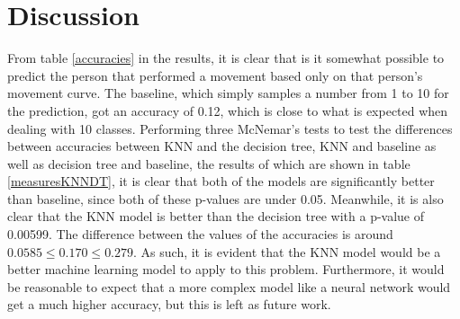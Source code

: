 \documentclass[11pt, fleqn, titlepage]{article}
\begin{document}
\section{Discussion}
From table \ref{accuracies} in the results, it is clear that is it somewhat possible to predict the person that performed a movement based only on that person's movement curve. The baseline, which simply samples a number from 1 to 10 for the prediction, got an accuracy of 0.12, which is close to what is expected when dealing with 10 classes. Performing three McNemar's tests to test the differences between accuracies between KNN and the decision tree, KNN and baseline as well as decision tree and baseline, the results of which are shown in table \ref{measuresKNNDT}, it is clear that both of the models are significantly better than baseline, since both of these p-values are under 0.05. Meanwhile, it is also clear that the KNN model is better than the decision tree with a p-value of 0.00599. The difference between the values of the accuracies is around $0.0585 \leq 0.170 \leq 0.279$. As such, it is evident that the KNN model would be a better machine learning model to apply to this problem. Furthermore, it would be reasonable to expect that a more complex model like a neural network would get a much higher accuracy, but this is left as future work.
\end{document}
